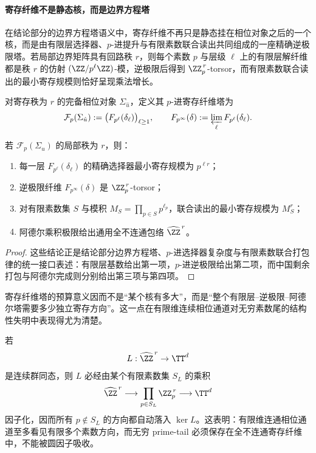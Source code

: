\paragraph{寄存纤维不是静态核，而是边界方程塔}
在结论部分的边界方程塔语义中，寄存纤维不再只是静态挂在相位对象之后的一个核，而是由有限层选择器、\(p\)-进提升与有限素数联合读出共同组成的一座精确逆极限塔。若局部边界矩阵具有回路秩 \(r\)，则每个素数 \(p\) 与层级 \(\ell\) 上的有限层解纤维都是秩 \(r\) 的仿射 \((\ZZ/p^\ell\ZZ)\)-模，逆极限后得到 \(\ZZ_p^{\,r}\)-torsor，而有限素数联合读出的最小寄存规模则恰好呈现乘法增长。

\begin{definition}[寄存纤维塔]\label{def:unit-circle-register-fiber-tower}
对寄存秩为 \(r\) 的完备相位对象 \(\Sigma_{\hat u}\)，定义其 \(p\)-进寄存纤维塔为
\[
\mathcal F_p(\Sigma_{\hat u})
:=
\bigl(F_{p^\ell}(\delta_\ell)\bigr)_{\ell\ge 1},
\qquad
F_{p^\infty}(\delta):=\varprojlim_{\ell}F_{p^\ell}(\delta_\ell).
\]
\end{definition}

\begin{proposition}[寄存纤维塔的预算律]\label{prop:unit-circle-register-fiber-budget}
若 \(\mathcal F_p(\Sigma_{\hat u})\) 的局部秩为 \(r\)，则：
\begin{enumerate}
  \item 每一层 \(F_{p^\ell}(\delta_\ell)\) 的精确选择器最小寄存规模为 \(p^{\ell r}\)；
  \item 逆极限纤维 \(F_{p^\infty}(\delta)\) 是 \(\ZZ_p^{\,r}\)-torsor；
  \item 对有限素数集 \(S\) 与模积 \(M_S=\prod_{p\in S}p^{\ell_p}\)，联合读出的最小寄存规模为 \(M_S^r\)；
  \item 阿德尔乘积极限给出通用全不连通包络 \(\widehat{\ZZ}^{\,r}\)。
\end{enumerate}
\end{proposition}
\begin{proof}
这些结论正是结论部分边界方程塔、\(p\)-进选择器复杂度与有限素数联合打包律的统一接口表述：有限层基数给出第一项，\(p\)-进逆极限给出第二项，而中国剩余打包与阿德尔完成则分别给出第三项与第四项。
\end{proof}

寄存纤维塔的预算意义因而不是“某个核有多大”，而是“整个有限层--逆极限--阿德尔塔需要多少独立寄存方向”。这一点在有限维连续相位通道对无穷素数尾的结构性失明中表现得尤为清楚。

\begin{remark}[有限维连续相位通道的结构性失明]\label{rem:unit-circle-finite-phase-prime-tail-blind}
若
\[
L:\widehat{\ZZ}^{\,r}\to \TT^d
\]
是连续群同态，则 \(L\) 必经由某个有限素数集 \(S_L\) 的乘积
\[
\widehat{\ZZ}^{\,r}\longrightarrow \prod_{p\in S_L}\ZZ_p^{\,r}\longrightarrow \TT^d
\]
因子化，因而所有 \(p\notin S_L\) 的方向都自动落入 \(\ker L\)。这表明：有限维连通相位通道至多看见有限多个素数方向，而无穷 prime-tail 必须保存在全不连通寄存纤维中，不能被圆因子吸收。
\end{remark}

